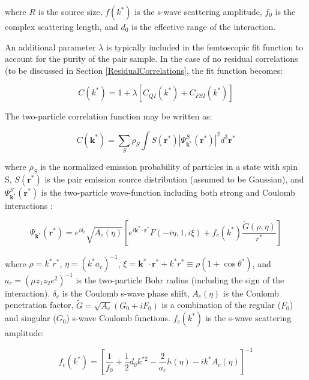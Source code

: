 \documentclass[ALICE,manyauthors]{cernphprep}
\begin{document}
where $R$ is the source size, $f(k^{*})$ is the s-wave scattering amplitude, $f_{0}$ is the complex scattering length, and $d_{0}$ is the effective range of the interaction.

An additional parameter $\lambda$ is typically included in the femtoscopic fit function to account for the purity of the pair sample.  In the case of no residual correlations (to be discussed in Section \ref{ResidualCorrelations}, the fit function becomes:

\begin{equation}
 C(k^{*}) = 1 + \lambda[C_{QI}(k^{*}) + C_{FSI}(k^{*})]
\label{eqn:LednickyEqnwLambda}
\end{equation}




The two-particle correlation function may be written as:

\begin{equation}
 C(\mathbf{k^{*}}) = \sum\limits_{S}\rho_{S}\int S(\mathbf{r^{*}})|\Psi^{S}_{\mathbf{k^{*}}}(\mathbf{r^{*}})|^{2}d^{3}\mathbf{r^{*}}
\label{eqn:GenCfEqn}
\end{equation}

where $\rho_{S}$ is the normalized emission probability of particles in a state with spin S, $S(\mathbf{r}^{*})$ is the pair emission source distribution (assumed to be Gaussian), and $\Psi^{S}_{\mathbf{k}^{*}}(\mathbf{r}^{*})$ is the two-particle wave-function including both strong and Coulomb interactions \cite{Lednicky:2005tb}:

\begin{equation}
 \Psi_{\mathbf{k^{*}}}(\mathbf{r^{*}}) = e^{i\delta_{c}}\sqrt{A_{c}(\eta)}[e^{i\mathbf{k^{*}} \cdot \mathbf{r^{*}}}F(-i\eta,1,i\xi) + f_{c}(k^{*})\frac{\tilde{G}(\rho,\eta)}{r^{*}}]
\label{eqn:CoulombWaveFcn}
\end{equation}

where $\rho = k^{*}r^{*}$, $\eta = (k^{*}a_{c})^{-1}$, $\xi = \mathbf{k^{*}} \cdot \mathbf{r^{*}} + k^{*}r^{*} \equiv \rho(1+\cos\theta^{*})$, and $a_{c} = (\mu z_{1}z_{2}e^{2})^{-1}$ is the two-particle Bohr radius (including the sign of the interaction).  $\delta_{c}$ is the Coulomb s-wave phase shift, $A_{c}(\eta)$ is the Coulomb penetration factor, $\tilde{G} = \sqrt{A_{c}}(G_{0} + iF_{0})$ is a combination of the regular ($F_{0}$) and singular ($G_{0}$) s-wave Coulomb functions.  $f_{c}(k^{*})$ is the s-wave scattering amplitude:

\begin{equation}
 f_{c}(k^{*}) = [\frac{1}{f_{0}} + \frac{1}{2}d_{0}k^{*2} - \frac{2}{a_{c}}h(\eta) - ik^{*}A_{c}(\eta)]^{-1}
\label{eqn:CoulombScattAmp}
\end{equation}
\end{document}
